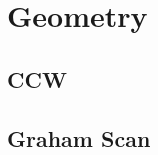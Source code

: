 \documentclass[10pt,landscape,a4paper,twocolumn]{article}
\begin{document}




\section{Geometry}
\subsection{CCW}


\iffalse
\subsection{Vector Class}

\fi

\subsection{Graham Scan}

\end{document}
